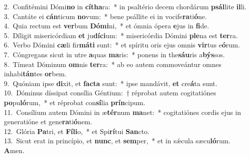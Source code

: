 {2.~}Confitémini Dómi\textbf{no} in \textbf{cí}\textbf{tha}ra:~* in psaltério decem chordárum \textbf{psál}lite \textbf{il}li.\\
{3.~}Cantáte ei \textbf{cán}ticum \textbf{no}vum:~* bene psállite ei in vocife\textbf{ra}ti\textbf{ó}ne.\\
{4.~}Quia rectum est \textbf{ver}bum \textbf{Dó}\textbf{mi}ni,~* et ómnia ópera \textbf{e}jus in \textbf{fi}de.\\
{5.~}Díligit misericórdiam \textbf{et} ju\textbf{dí}\textbf{ci}um:~* misericórdia Dómini \textbf{ple}na est \textbf{ter}ra.\\
{6.~}Verbo Dómini \textbf{cæ}li fir\textbf{má}\textbf{ti} sunt:~* et spíritu oris ejus omnis \textbf{vir}tus e\textbf{ó}rum.\\
{7.~}Cóngregans sicut in utre \textbf{a}quas \textbf{ma}ris:~* ponens in the\textbf{sáu}ris a\textbf{býs}sos.\\
{8.~}Tímeat Dóminum \textbf{om}nis \textbf{ter}ra:~* ab eo autem commoveántur omnes inhabi\textbf{tán}tes \textbf{or}bem.\\
{9.~}Quóniam ipse \textbf{di}xit, et \textbf{fa}\textbf{cta} sunt:~* ipse mandávit, \textbf{et} cre\textbf{á}ta sunt.\\
{10.~}Dóminus díssipat consília Géntium:~† réprobat autem cogitatiónes \textbf{po}pu\textbf{ló}rum,~* et réprobat con\textbf{sí}lia \textbf{prín}cipum.\\
{11.~}Consílium autem Dómini in æ\textbf{tér}num \textbf{ma}net:~* cogitatiónes cordis ejus in generatióne et gene\textbf{ra}ti\textbf{ó}nem.\\
{12.~}Glória \textbf{Pa}tri, et \textbf{Fí}\textbf{li}o,~* et Spi\textbf{rí}tui \textbf{San}cto.\\
{13.~}Sicut erat in princípio, et \textbf{nunc}, et \textbf{sem}per,~* et in sǽcula sæcu\textbf{ló}rum. \textbf{A}men.\\
